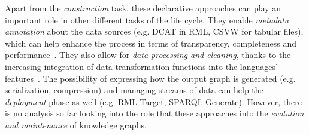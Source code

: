 Apart from the \textit{construction} task, these declarative approaches can play an important role in other different tasks of the life cycle. They enable \textit{metadata annotation} about the data sources (e.g. DCAT in RML, CSVW for tabular files), which can help enhance the process in terms of transparency, completeness and performance~\parencite{chaves2021morph-csv,vidal2023knowledge}. 
They also allow for \textit{data processing and cleaning}, thanks to the increasing integration of data transformation functions into the languages' features~\parencite{debruyne2016r2rmlf,junior2016funul,jozashoori2020funmap,DeMeester2017fno_dbpedia}.
The possibility of expressing how the output graph is generated (e.g. serialization, compression) and managing streams of data can help the \textit{deployment} phase as well (e.g. RML Target, SPARQL-Generate). However, there is no analysis so far looking into the role that these approaches into the \textit{evolution and maintenance} of knowledge graphs. 



